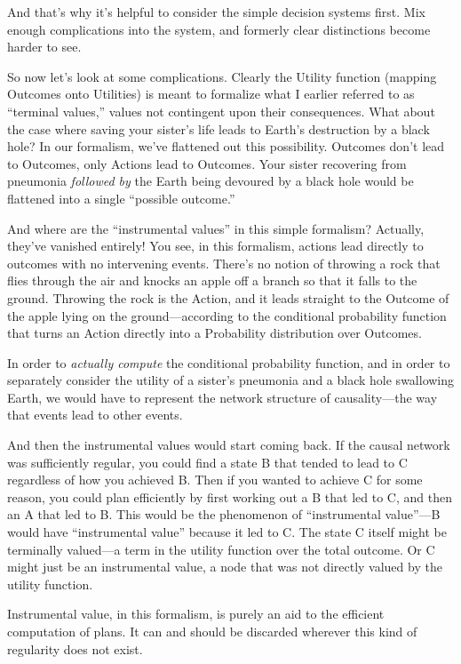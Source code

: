 {
 And that's why it's helpful to
consider the simple decision systems first. Mix enough complications
into the system, and formerly clear distinctions become harder to see.}

{
 So now let's look at some complications. Clearly
the Utility function (mapping Outcomes onto Utilities) is meant to
formalize what I earlier referred to as ``terminal
values,'' values not contingent upon their
consequences. What about the case where saving your
sister's life leads to Earth's
destruction by a black hole? In our formalism, we've
flattened out this possibility. Outcomes don't lead to
Outcomes, only Actions lead to Outcomes. Your sister recovering from
pneumonia \textit{followed by} the Earth being devoured by a black hole
would be flattened into a single ``possible
outcome.''}

{
 And where are the ``instrumental
values'' in this simple formalism? Actually,
they've vanished entirely! You see, in this formalism,
actions lead directly to outcomes with no intervening events.
There's no notion of throwing a rock that flies through
the air and knocks an apple off a branch so that it falls to the
ground. Throwing the rock is the Action, and it leads straight to the
Outcome of the apple lying on the ground---according to the conditional
probability function that turns an Action directly into a Probability
distribution over Outcomes.}

{
 In order to \textit{actually compute} the conditional probability
function, and in order to separately consider the utility of a
sister's pneumonia and a black hole swallowing Earth,
we would have to represent the network structure of causality---the way
that events lead to other events.}

{
 And then the instrumental values would start coming back. If the
causal network was sufficiently regular, you could find a state B that
tended to lead to C regardless of how you achieved B. Then if you
wanted to achieve C for some reason, you could plan efficiently by
first working out a B that led to C, and then an A that led to B. This
would be the phenomenon of ``instrumental
value''---B would have
``instrumental value'' because it
led to C. The state C itself might be terminally valued---a term in the
utility function over the total outcome. Or C might just be an
instrumental value, a node that was not directly valued by the utility
function.}

{
 Instrumental value, in this formalism, is purely an aid to the
efficient computation of plans. It can and should be discarded wherever
this kind of regularity does not exist.}

